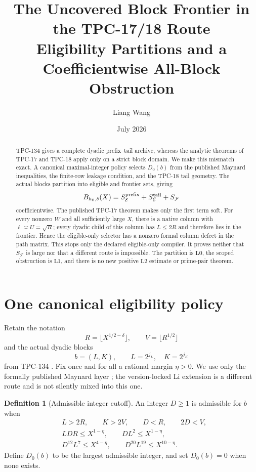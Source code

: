 \documentclass[11pt]{article}
\title{\textbf{The Uncovered Block Frontier in the TPC-17/18 Route}\\
\large Eligibility Partitions and a Coefficientwise All-Block
Obstruction}
\author{Liang Wang}
\date{July 2026}
\theoremstyle{definition}
\newtheorem{definition}[theorem]{Definition}
\theoremstyle{remark}
\newcommand{\E}{\mathcal E}
\newcommand{\F}{\mathcal F}
\newcommand{\Lzero}{\mathrm{L0}}
\newcommand{\Lone}{\mathrm{L1}}
\newcommand{\Ltwo}{\mathrm{L2}}
\begin{document}
\maketitle

\begin{abstract}
TPC-134 gives a complete dyadic prefix--tail archive, whereas the
analytic theorems of TPC-17 and TPC-18 apply only on a strict block
domain.  We make this mismatch exact.  A canonical maximal-integer
policy selects \(D_0(b)\) from the published Maynard inequalities,
the finite-row leakage condition, and the TPC-18 tail geometry.  The
actual blocks partition into eligible and frontier sets, giving
\[
 B_{h_0,\delta}(X)
 =S_{\E}^{\rm prefix}+S_{\E}^{\rm tail}+S_{\F}
\]
coefficientwise.  The published TPC-17 theorem makes only the first
term soft.  For every nonzero \(W\) and all sufficiently large \(X\),
there is a native column with \(\ell\asymp U=\sqrt R\); every dyadic
child of this column has \(L\le2R\) and therefore lies in the
frontier.  Hence the eligible-only selector has a nonzero formal
column defect in the path matrix.  This stops only the declared
eligible-only compiler.  It proves neither that \(S_{\F}\) is large
nor that a different route is impossible.  The partition is
\(\Lzero\), the scoped obstruction is \(\Lone\), and there is no new
positive \(\Ltwo\) estimate or prime-pair theorem.
\end{abstract}

\section{One canonical eligibility policy}

Retain the notation
\[
 R=\lfloor X^{1/2-\delta}\rfloor,\qquad
 V=\lfloor R^{1/2}\rfloor
\]
and the actual dyadic blocks
\[
 b=(L,K),\qquad L=2^{j_L},\quad K=2^{j_K}
\]
from TPC-134 \citep{WangTPC134}.  Fix once and for all a rational
margin \(\eta>0\).  We use only the formally published Maynard layer
\citep{Maynard2025I,WangTPC17}; the version-locked Li extension is a
different route and is not silently mixed into this one.

\begin{definition}[Admissible integer cutoff]
\label{def:admissible}
An integer \(D\ge1\) is admissible for \(b\) when
\begin{align}
 &L>2R,\qquad K>2V,\qquad D<R,\qquad 2D<V,
 \label{eq:geometry}\\
 &LDR\le X^{1-\eta},\qquad
 DL^2\le X^{1-\eta},
 \label{eq:leakage}\\
 &D^{12}L^7\le X^{4-\eta},\qquad
 D^{20}L^{19}\le X^{10-\eta}.
 \label{eq:maynard}
\end{align}
Define \(D_0(b)\) to be the largest admissible integer, and set
\(D_0(b)=0\) when none exists.
\end{definition}
\end{document}
